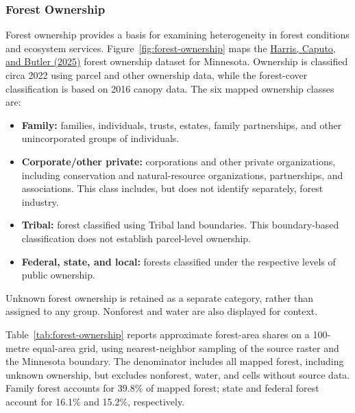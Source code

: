 \documentclass[11pt]{article}
\begin{document}
\subsubsection{Forest Ownership}

Forest ownership provides a basis for examining heterogeneity in forest conditions and ecosystem services. Figure~\ref{fig:forest-ownership} maps the \href{https://doi.org/10.2737/RDS-2025-0045}{Harris, Caputo, and Butler (2025)} forest ownership dataset for Minnesota. Ownership is classified circa 2022 using parcel and other ownership data, while the forest-cover classification is based on 2016 canopy data. The six mapped ownership classes are:
\begin{itemize}
\item \textbf{Family:} families, individuals, trusts, estates, family partnerships, and other unincorporated groups of individuals.
\item \textbf{Corporate/other private:} corporations and other private organizations, including conservation and natural-resource organizations, partnerships, and associations. This class includes, but does not identify separately, forest industry.
\item \textbf{Tribal:} forest classified using Tribal land boundaries. This boundary-based classification does not establish parcel-level ownership.
\item \textbf{Federal, state, and local:} forests classified under the respective levels of public ownership.
\end{itemize}
Unknown forest ownership is retained as a separate category, rather than assigned to any group. Nonforest and water are also displayed for context.

Table~\ref{tab:forest-ownership} reports approximate forest-area shares on a 100-metre equal-area grid, using nearest-neighbor sampling of the source raster and the Minnesota boundary. The denominator includes all mapped forest, including unknown ownership, but excludes nonforest, water, and cells without source data. Family forest accounts for 39.8\% of mapped forest; state and federal forest account for 16.1\% and 15.2\%, respectively.
\end{document}
